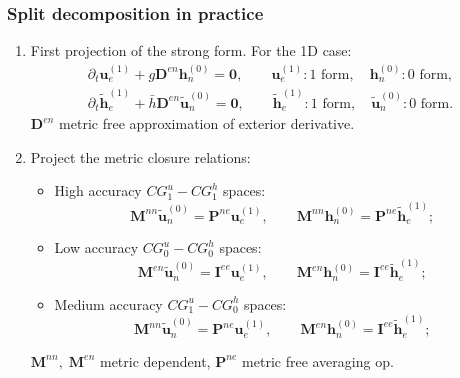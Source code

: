 \documentclass{beamer}
\begin{document}
\begin{frame}\frametitle{Split decomposition in practice}
\begin{enumerate}
\item First projection of the strong form.  For the 1D case:
\begin{equation*}
	\begin{aligned}
		\partial_t \mathbf{u}_e^{(1)} + g \mathbf{D}^{en} \mathbf{h}_n^{(0)} = \mathbf{0}, \qquad \mathbf{u}_e^{(1)}: \text{1 form}, \quad \mathbf{h}_n^{(0)}: \text{0 form}, \\
		\partial_t \widetilde{\mathbf{h}}_e^{(1)} + \bar{h} \mathbf{D}^{en} \widetilde{\mathbf{u}}_n^{(0)} = \mathbf{0}, \qquad \widetilde{\mathbf{h}}_e^{(1)}: \text{1 form}, \quad \widetilde{\mathbf{u}}_n^{(0)}: \text{0 form}.
	\end{aligned}
\end{equation*}
$\mathbf{D}^{en}$ metric free approximation of exterior derivative. \vspace{.3cm}
\item Project the metric closure relations:
\begin{itemize}
	\item High accuracy $CG_1^u-CG_1^h$ spaces: 
	$$\mathbf{M}^{nn} \widetilde{\mathbf{u}}_n^{(0)}=\mathbf{P}^{ne}\mathbf{u}_e^{(1)}, \qquad \mathbf{M}^{nn} \mathbf{h}_n^{(0)}=\mathbf{P}^{ne}\widetilde{\mathbf{h}}_e^{(1)};$$
	\item Low accuracy $CG_0^u-CG_0^h$ spaces: 
	$$\mathbf{M}^{en} \widetilde{\mathbf{u}}_n^{(0)}=\mathbf{I}^{ee}\mathbf{u}_e^{(1)}, \qquad \mathbf{M}^{en} \mathbf{h}_n^{(0)}=\mathbf{I}^{ee}\widetilde{\mathbf{h}}_e^{(1)};$$
	\item Medium accuracy $CG_1^u-CG_0^h$ spaces: 
	$$\mathbf{M}^{nn} \widetilde{\mathbf{u}}_n^{(0)}=\mathbf{P}^{ne}\mathbf{u}_e^{(1)}, \qquad \mathbf{M}^{en} \mathbf{h}_n^{(0)}=\mathbf{I}^{ee}\widetilde{\mathbf{h}}_e^{(1)};$$
\end{itemize}
$\mathbf{M}^{nn}, \; \mathbf{M}^{en}$ metric dependent, $\mathbf{P}^{ne}$ metric free averaging op.	
\end{enumerate}

\end{frame}
\end{document}
